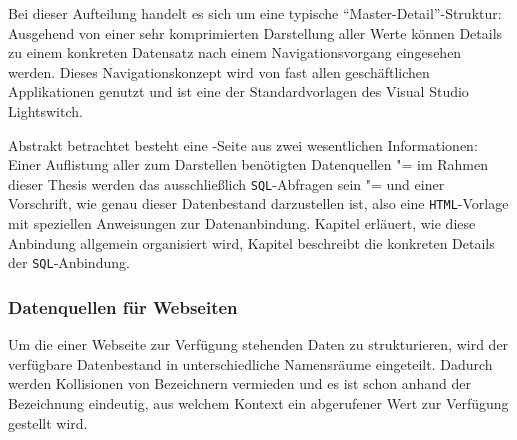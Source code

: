 Bei dieser Aufteilung handelt es sich um eine typische "`Master-Detail"'-Struktur: Ausgehend von einer sehr komprimierten Darstellung aller Werte können Details zu einem konkreten Datensatz nach einem Navigationsvorgang eingesehen werden. Dieses Navigationskonzept wird von fast allen geschäftlichen Applikationen genutzt und ist eine der Standardvorlagen des Visual Studio Lightswitch.

Abstrakt betrachtet besteht eine \idename{}-Seite aus zwei wesentlichen Informationen: Einer Auflistung aller zum Darstellen benötigten Datenquellen "= im Rahmen dieser Thesis werden das ausschließlich \texttt{SQL}-Abfragen sein "= und einer Vorschrift, wie genau dieser Datenbestand darzustellen ist, also eine \texttt{HTML}-Vorlage mit speziellen Anweisungen zur Datenanbindung. Kapitel  erläuert, wie diese Anbindung allgemein organisiert wird, Kapitel  beschreibt die konkreten Details der \texttt{SQL}-Anbindung.

\subsubsection{Datenquellen für Webseiten}
\label{sec:page-data-sources}

Um die einer Webseite zur Verfügung stehenden Daten zu strukturieren, wird der verfügbare Datenbestand in unterschiedliche Namensräume eingeteilt. Dadurch werden Kollisionen von Bezeichnern vermieden und es ist schon anhand der Bezeichnung eindeutig, aus welchem Kontext ein abgerufener Wert zur Verfügung gestellt wird.

